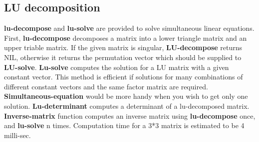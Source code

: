\subsection{LU decomposition}
{\bf lu-decompose} and {\bf lu-solve} are provided to solve
simultaneous linear equations.
First, {\bf lu-decompose} decomposes a matrix into a lower triangle matrix
and an upper triable matrix.
If the given matrix is singular, {\bf LU-decompose} returns NIL, otherwise
it returns the permutation vector which should be supplied to {\bf LU-solve}.
{\bf Lu-solve} computes the solution for a LU matrix with a given constant vector.
This method is efficient if solutions for many combinations 
of different constant vectors and the same factor matrix are required.
{\bf Simultaneous-equation} would be  more handy when you wish to get
only one solution.
{\bf Lu-determinant} computes a determinant of a lu-decomposed matrix.
{\bf Inverse-matrix} function computes an inverse matrix using {\bf lu-decompose}
once, and {\bf lu-solve} n times.
Computation time for a 3*3 matrix is estimated to be 4 milli-sec.


